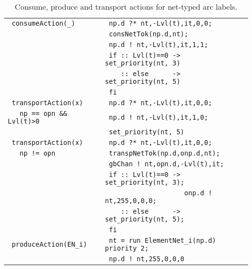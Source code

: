 \documentclass{llncs}
\begin{document}
\small
\begin{table}[t!]
\begin{center}\begin{tabular}{|l|l|}
      \hline
      \verb" consumeAction(_)" & \verb" np.d ?* nt,-Lvl(t),it,0,0; "    \\
                               & \verb" consNetTok(np.d,nt);"          \\
                               & \verb" np.d ! nt,-Lvl(t),it,1,1;"        \\
                               & \verb" if :: Lvl(t)==0 -> set_priority(nt, 3)" \\
                               & \verb"    :: else      -> set_priority(nt, 5)"  \\
                               & \verb" fi"                   \\
      \hline
      \verb" transportAction(x) "        & \verb" np.d ?* nt,-Lvl(t),it,0,0;"\\
      \verb"   np == opn && Lvl(t)>0  "  & \verb" np.d ! nt,-Lvl(t),it,1,0;"   \\
                                         & \verb" set_priority(nt, 5)"        \\
      \hline
      \verb" transportAction(x)" & \verb" np.d ?* nt,-Lvl(t),it,0,0;"\\
      \verb"   np != opn "         & \verb" transpNetTok(np.d,onp.d,nt);" \\
                                 & \verb" gbChan ! nt,opn.d,-Lvl(t),it;"    \\
                                 & \verb" if :: Lvl(t)==0 -> set_priority(nt, 3);  " \\
                                 & \verb"                    onp.d ! nt,255,0,0,0;"  \\
                                 & \verb"    :: else      -> set_priority(nt, 5);"   \\
& \verb" fi"                   \\
      \hline
      \verb" produceAction(EN_i)" & \verb" nt = run ElementNet_i(np.d) priority 2;"\\
                                  & \verb" np.d ! nt,255,0,0,0 "\\
      \hline
\end{tabular}\end{center}
\vspace{-2pt}
\caption{Consume, produce and transport actions for net-typed arc labels.}
\label{tab.act.net.places}
\end{table}
\normalsize
\end{document}
